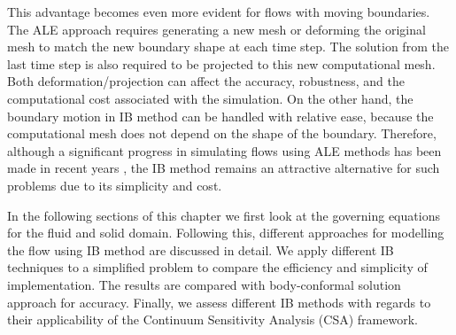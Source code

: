 This advantage becomes even more evident for flows with moving boundaries. The ALE approach requires generating a new mesh or deforming the original mesh to match the new boundary shape at each time step. The solution from the last time step is also required to be projected to this new computational mesh. Both deformation/projection can affect the accuracy, robustness, and the computational cost associated with the simulation. On the other hand, the boundary motion in IB method can be handled with relative ease, because the computational mesh does not depend on the shape of the boundary. Therefore, although a significant progress in simulating flows using ALE methods has been made in recent years \cite{lomtev1999discontinuous, farhat2004cfd, cheng2005fluid}, the IB method remains an attractive alternative for such problems due to its simplicity and cost.

In the following sections of this chapter we first look at the governing equations for the fluid and solid domain. Following this, different approaches for modelling the flow using IB method are discussed in detail. We apply different IB techniques to a simplified problem to compare the efficiency and simplicity of implementation. The results are compared with body-conformal solution approach for accuracy. Finally, we assess different IB methods with regards to their applicability of the Continuum Sensitivity Analysis (CSA) framework.

